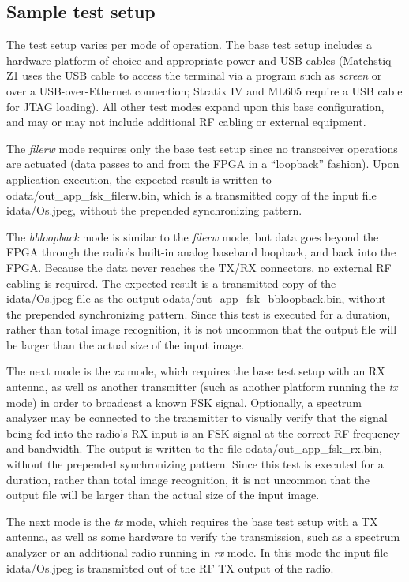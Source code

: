 \subsection{Sample test setup}
The test setup varies per mode of operation. The base test setup includes a hardware platform of choice and appropriate power and USB cables (Matchstiq-Z1 uses the USB cable to access the terminal via a program such as \textit{screen} or over a USB-over-Ethernet connection; Stratix IV and ML605 require a USB cable for JTAG loading). All other test modes expand upon this base configuration, and may or may not include additional RF cabling or external equipment.\par\medskip
\noindent The \textit{filerw} mode requires only the base test setup since no transceiver operations are actuated (data passes to and from the FPGA in a ``loopback'' fashion). Upon application execution, the expected result is written to odata/out\_app\_fsk\_filerw.bin, which is a transmitted copy of the input file idata/Os.jpeg, without the prepended synchronizing pattern.\par\medskip
\noindent The \textit{bbloopback} mode is similar to the \textit{filerw} mode, but data goes beyond the FPGA through the radio's built-in analog baseband loopback, and back into the FPGA. Because the data never reaches the TX/RX connectors, no external RF cabling is required. The expected result is a transmitted copy of the idata/Os.jpeg file as the output odata/out\_app\_fsk\_bbloopback.bin, without the prepended synchronizing pattern. Since this test is executed for a duration, rather than total image recognition, it is not uncommon that the output file will be larger than the actual size of the input image.\par\medskip
\noindent The next mode is the \textit{rx} mode, which requires the base test setup with an RX antenna, as well as another transmitter (such as another platform running the \textit{tx} mode) in order to broadcast a known FSK signal. Optionally, a spectrum analyzer may be connected to the transmitter to visually verify that the signal being fed into the radio's RX input is an FSK signal at the correct RF frequency and bandwidth. The output is written to the file odata/out\_app\_fsk\_rx.bin, without the prepended synchronizing pattern. Since this test is executed for a duration, rather than total image recognition, it is not uncommon that the output file will be larger than the actual size of the input image.\par\medskip
\noindent The next mode is the \textit{tx} mode, which requires the base test setup with a TX antenna, as well as some hardware to verify the transmission, such as a spectrum analyzer or an additional radio running in \textit{rx} mode. In this mode the input file idata/Os.jpeg is transmitted out of the RF TX output of the radio.\par\medskip
